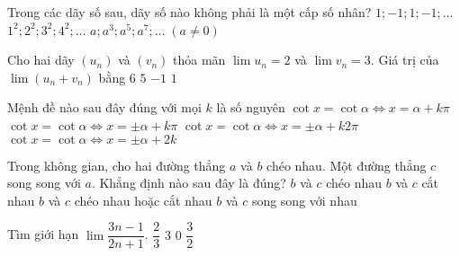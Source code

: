 \begin{ex} %
Trong các dãy số sau, dãy số nào không phải là một cấp số nhân?
{$1;-1;1;-1;\ldots$}
{\True $1^2;2^2;3^2; 4^2;\ldots$}
{$a;a^3;a^5;a^7;\ldots \; \left(a\ne 0\right)$}
\end{ex}

\begin{ex}%
Cho hai dãy $\left(u_n\right)$ và $\left(v_n\right)$ thỏa mãn $\lim u_n=2$ và $\lim v_n=3.$ Giá trị của $\lim\left(u_n+v_n\right)$ bằng
\choice
{$ 6$}
{\True $ 5$}
{$-1$}
{$ 1$}

\end{ex}

\begin{ex}%
Mệnh đề nào sau đây đúng với mọi $k$ là số nguyên
\choice
{\True $\cot{x} = \cot{\alpha} \Leftrightarrow x = \alpha + k \pi$}
{$\cot{x} = \cot{\alpha} \Leftrightarrow x = \pm \alpha + k \pi$}
{$\cot{x} = \cot{\alpha} \Leftrightarrow x = \pm \alpha + k2 \pi$}
{$\cot{x} = \cot{\alpha} \Leftrightarrow x = \pm \alpha + 2k$}
\end{ex}

\begin{ex}%
Trong không gian, cho hai đường thẳng $a$ và $b$ chéo nhau. Một đường thẳng $c$ song song với $a$. Khẳng định nào sau đây là đúng?
\choice
{$b$ và $c$ chéo nhau}
{$b$ và $c$ cắt nhau}
{\True $b$ và $c$ chéo nhau hoặc cắt nhau}
{$b$ và $c$ song song với nhau}
\end{ex}

\begin{ex}%
Tìm giới hạn $\lim \dfrac{3n-1}{2n+1}$.
\choice
{$\dfrac{2}{3}$}
{$3$}
{$0$}
{\True $\dfrac{3}{2}$}
\end{ex}


